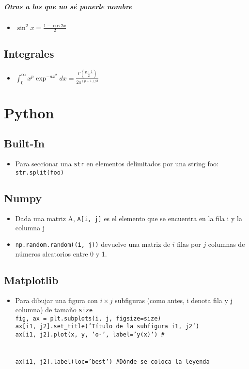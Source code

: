 \documentclass[a4paper]{book}
\begin{document}
\paragraph{Otras a las que no sé ponerle nombre}
\begin{itemize}
	\item $\sin^2x = \frac{1 - \cos2x}{2}$
\end{itemize}
\section{Integrales}
\begin{itemize}
	\item $\int_{0}^{\infty} x^{p}\exp^{-ax^2} dx= \frac{\Gamma\left( \frac{p+1}{2} \right) }{2a ^{(p+1) /2}} $
\end{itemize}

\chapter{Python}

\section{Built-In}
\begin{itemize}
	\item Para seccionar una \texttt{str} en elementos delimitados por una string foo: \texttt{str.split(foo)} 
\end{itemize}

\section{Numpy}
\begin{itemize}
	\item Dada una matriz A, \texttt{A[i, j]} es el elemento que se encuentra en la fila i y la columna j
	\item \texttt{np.random.random((i, j))} devuelve una matriz de $i$ filas por $j$ columnas de números aleatorios entre 0 y 1.
\end{itemize}

\section{Matplotlib}
\begin{itemize}
	\item Para dibujar una figura con $i\times j$ subfiguras (como antes, i denota fila y j columna) de tamaño \texttt{size}
		\texttt{\\
			fig, ax = plt.subplots(i, j,  figsize=size) \\
			ax[i1, j2].set\_title('Título de la subfigura i1, j2') \\
		ax[i1, j2].plot(x, y, 'o-', label='y(x)') \# \\\\ \\
			ax[i1, j2].label(loc='best') \#Dónde se coloca la leyenda
		}
\end{itemize}
\end{document}

